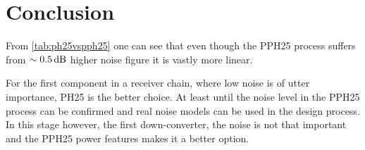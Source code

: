 	\section{Conclusion}
		From \autoref{tab:ph25vspph25} one can see that even though the PPH25 process suffers from $\sim \unit[0.5]{dB}$ higher noise figure it is vastly more linear.
		

		For the first component in a receiver chain, where low noise is of utter importance, PH25 is the better choice. At least until the noise level in the PPH25 process can be confirmed and real noise models can be used in the design process. In this stage however, the first down-converter, the noise is not that important and the PPH25 power features makes it a better option.